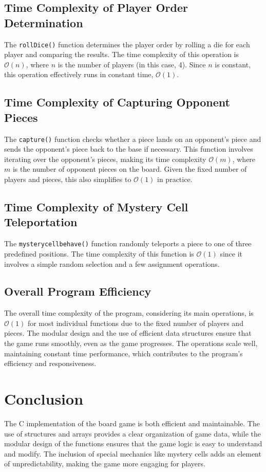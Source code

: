 \documentclass{article}
\begin{document}
\subsection{Time Complexity of Player Order Determination}
The \texttt{rollDice()} function determines the player order by rolling a die for each player and comparing the results. The time complexity of this operation is \(\mathcal{O}(n)\), where \(n\) is the number of players (in this case, 4). Since \(n\) is constant, this operation effectively runs in constant time, \(\mathcal{O}(1)\).

\subsection{Time Complexity of Capturing Opponent Pieces}
The \texttt{capture()} function checks whether a piece lands on an opponent's piece and sends the opponent's piece back to the base if necessary. This function involves iterating over the opponent's pieces, making its time complexity \(\mathcal{O}(m)\), where \(m\) is the number of opponent pieces on the board. Given the fixed number of players and pieces, this also simplifies to \(\mathcal{O}(1)\) in practice.

\subsection{Time Complexity of Mystery Cell Teleportation}
The \texttt{mysterycellbehave()} function randomly teleports a piece to one of three predefined positions. The time complexity of this function is \(\mathcal{O}(1)\) since it involves a simple random selection and a few assignment operations.

\subsection{Overall Program Efficiency}
The overall time complexity of the program, considering its main operations, is \(\mathcal{O}(1)\) for most individual functions due to the fixed number of players and pieces. The modular design and the use of efficient data structures ensure that the game runs smoothly, even as the game progresses. The operations scale well, maintaining constant time performance, which contributes to the program's efficiency and responsiveness.



\section{Conclusion}
The C implementation of the board game is both efficient and maintainable. The use of structures and arrays provides a clear organization of game data, while the modular design of the functions ensures that the game logic is easy to understand and modify. The inclusion of special mechanics like mystery cells adds an element of unpredictability, making the game more engaging for players.
\end{document}
